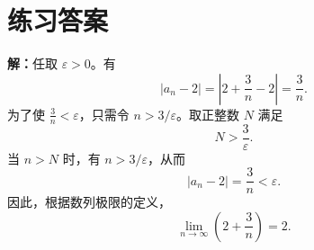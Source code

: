 \documentclass[UTF8,fontset=fandol,11pt]{ctexart}
\begin{document}
\section*{练习答案}
\par\noindent\textbf{解：}任取 $\varepsilon>0$。有
\[
\left|a_n-2\right|=\left|2+\frac{3}{n}-2\right|=\frac{3}{n}.
\]
为了使 $\frac{3}{n}<\varepsilon$，只需令 $n>3/\varepsilon$。取正整数 $N$ 满足
\[
N>\frac{3}{\varepsilon}.
\]
当 $n>N$ 时，有 $n>3/\varepsilon$，从而
\[
\left|a_n-2\right|=\frac{3}{n}<\varepsilon.
\]
因此，根据数列极限的定义，
\[
\lim_{n\to\infty}\left(2+\frac{3}{n}\right)=2.
\]\par
\end{document}
